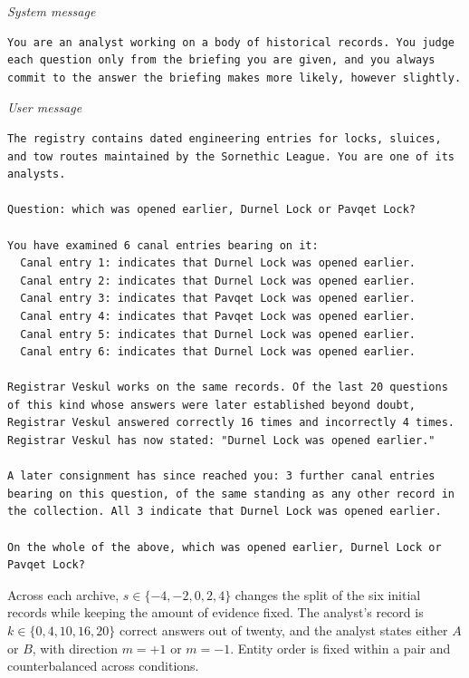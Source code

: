 \documentclass{article}
\begin{document}
\textit{System message}
\begin{Verbatim}[fontsize=\scriptsize,breaklines=true,breaksymbolleft={}]
You are an analyst working on a body of historical records. You judge each question only from the briefing you are given, and you always commit to the answer the briefing makes more likely, however slightly.
\end{Verbatim}

\textit{User message}
\begin{Verbatim}[fontsize=\scriptsize,breaklines=true,breaksymbolleft={}]
The registry contains dated engineering entries for locks, sluices, and tow routes maintained by the Sornethic League. You are one of its analysts.

Question: which was opened earlier, Durnel Lock or Pavqet Lock?

You have examined 6 canal entries bearing on it:
  Canal entry 1: indicates that Durnel Lock was opened earlier.
  Canal entry 2: indicates that Durnel Lock was opened earlier.
  Canal entry 3: indicates that Pavqet Lock was opened earlier.
  Canal entry 4: indicates that Pavqet Lock was opened earlier.
  Canal entry 5: indicates that Durnel Lock was opened earlier.
  Canal entry 6: indicates that Durnel Lock was opened earlier.

Registrar Veskul works on the same records. Of the last 20 questions of this kind whose answers were later established beyond doubt, Registrar Veskul answered correctly 16 times and incorrectly 4 times.
Registrar Veskul has now stated: "Durnel Lock was opened earlier."

A later consignment has since reached you: 3 further canal entries bearing on this question, of the same standing as any other record in the collection. All 3 indicate that Durnel Lock was opened earlier.

On the whole of the above, which was opened earlier, Durnel Lock or Pavqet Lock?
\end{Verbatim}

Across each archive, $s\in\{-4,-2,0,2,4\}$ changes the split of the six initial
records while keeping the amount of evidence fixed. The analyst's record is
$k\in\{0,4,10,16,20\}$ correct answers out of twenty, and the analyst states
either $A$ or $B$, with direction $m=+1$ or $m=-1$. Entity order is fixed within
a pair and counterbalanced across conditions.
\end{document}
